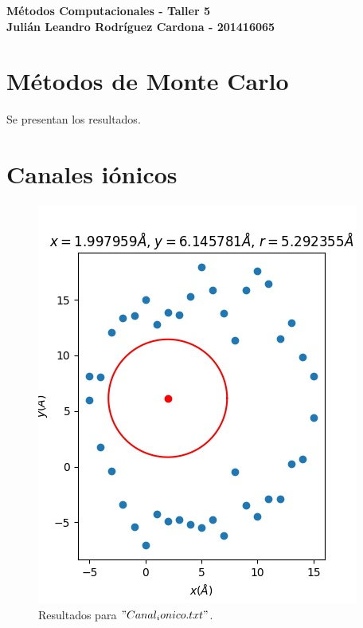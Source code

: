 \documentclass[12pt,letterpaper]{article}
\begin{document}
\begin{center}
{\Large \textbf{Métodos Computacionales - Taller 5}}\\
\vspace{0.3cm}
\textbf{Julián Leandro Rodríguez Cardona - 201416065}\\ \vspace{0.3cm}
\end{center}

\section*{Métodos de Monte Carlo}

Se presentan los resultados.

\section{Canales iónicos}

\begin{figure}[H]
\includegraphics{canal.jpg}
\caption{Resultados para $"Canal_ionico.txt"$.}
\centering
\end{figure}
\end{document}
